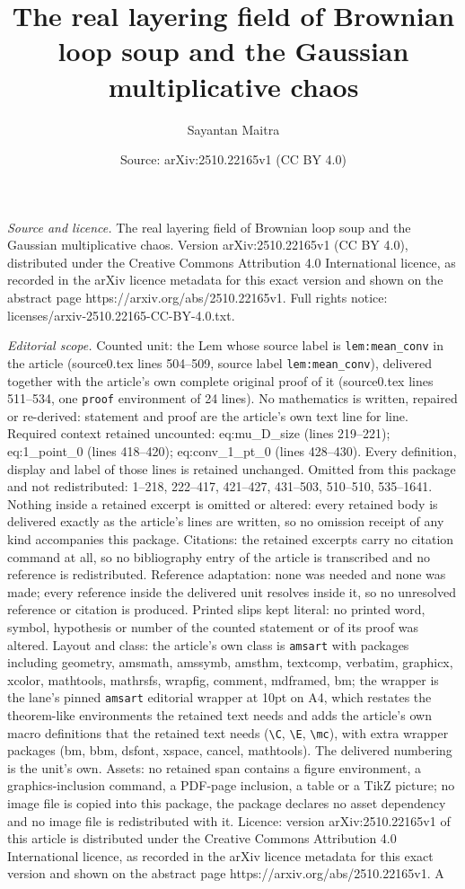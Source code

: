 \documentclass[10pt,a4paper]{amsart}
\title[The real layering field of Brownian loop soup and the Gaussi]{The real layering field of Brownian loop soup and the Gaussian multiplicative chaos}
\author{Sayantan Maitra}
\date{Source: arXiv:2510.22165v1 (CC BY 4.0)}
\begin{document}
\maketitle

\noindent\emph{Source and licence.} The real layering field of Brownian loop soup and the Gaussian multiplicative chaos. Version arXiv:2510.22165v1 (CC BY 4.0), distributed under the Creative Commons Attribution 4.0 International licence, as recorded in the arXiv licence metadata for this exact version and shown on the abstract page https://arxiv.org/abs/2510.22165v1. Full rights notice: licenses/arxiv-2510.22165-CC-BY-4.0.txt.\par\smallskip

\noindent\textit{Editorial scope.} Counted unit: the Lem whose source label is \texttt{lem:mean\_conv} in the article (source0.tex lines 504--509, source label \texttt{lem:mean\_conv}), delivered together with the article's own complete original proof of it (source0.tex lines 511--534, one \texttt{proof} environment of 24 lines). No mathematics is written, repaired or re-derived: statement and proof are the article's own text line for line. Required context retained uncounted: eq:mu\_D\_size (lines 219--221); eq:1\_point\_0 (lines 418--420); eq:conv\_1\_pt\_0 (lines 428--430). Every definition, display and label of those lines is retained unchanged. Omitted from this package and not redistributed: 1--218, 222--417, 421--427, 431--503, 510--510, 535--1641. Nothing inside a retained excerpt is omitted or altered: every retained body is delivered exactly as the article's lines are written, so no omission receipt of any kind accompanies this package. Citations: the retained excerpts carry no citation command at all, so no bibliography entry of the article is transcribed and no reference is redistributed. Reference adaptation: none was needed and none was made; every reference inside the delivered unit resolves inside it, so no unresolved reference or citation is produced. Printed slips kept literal: no printed word, symbol, hypothesis or number of the counted statement or of its proof was altered. Layout and class: the article's own class is \texttt{amsart} with packages including geometry, amsmath, amssymb, amsthm, textcomp, verbatim, graphicx, xcolor, mathtools, mathrsfs, wrapfig, comment, mdframed, bm; the wrapper is the lane's pinned \texttt{amsart} editorial wrapper at 10pt on A4, which restates the theorem-like environments the retained text needs and adds the article's own macro definitions that the retained text needs (\texttt{\textbackslash C}, \texttt{\textbackslash E}, \texttt{\textbackslash mc}), with extra wrapper packages (bm, bbm, dsfont, xspace, cancel, mathtools). The delivered numbering is the unit's own. Assets: no retained span contains a figure environment, a graphics-inclusion command, a PDF-page inclusion, a table or a TikZ picture; no image file is copied into this package, the package declares no asset dependency and no image file is redistributed with it. Licence: version arXiv:2510.22165v1 of this article is distributed under the Creative Commons Attribution 4.0 International licence, as recorded in the arXiv licence metadata for this exact version and shown on the abstract page https://arxiv.org/abs/2510.22165v1. A 
\end{document}
